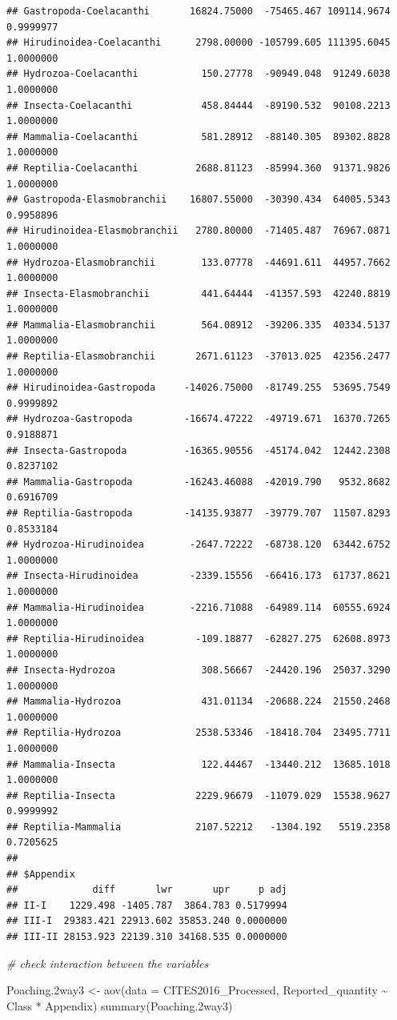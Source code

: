 \documentclass[
  12pt,
]{article}
\newenvironment{Shaded}{\begin{snugshade}}{\end{snugshade}}
\newcommand{\AttributeTok}[1]{\textcolor[rgb]{0.77,0.63,0.00}{#1}}
\newcommand{\CommentTok}[1]{\textcolor[rgb]{0.56,0.35,0.01}{\textit{#1}}}
\newcommand{\FloatTok}[1]{\textcolor[rgb]{0.00,0.00,0.81}{#1}}
\newcommand{\FunctionTok}[1]{\textcolor[rgb]{0.00,0.00,0.00}{#1}}
\newcommand{\NormalTok}[1]{#1}
\newcommand{\OtherTok}[1]{\textcolor[rgb]{0.56,0.35,0.01}{#1}}
\newcommand{\SpecialCharTok}[1]{\textcolor[rgb]{0.00,0.00,0.00}{#1}}
\begin{document}
\begin{verbatim}
## Gastropoda-Coelacanthi       16824.75000  -75465.467 109114.9674 0.9999977
## Hirudinoidea-Coelacanthi      2798.00000 -105799.605 111395.6045 1.0000000
## Hydrozoa-Coelacanthi           150.27778  -90949.048  91249.6038 1.0000000
## Insecta-Coelacanthi            458.84444  -89190.532  90108.2213 1.0000000
## Mammalia-Coelacanthi           581.28912  -88140.305  89302.8828 1.0000000
## Reptilia-Coelacanthi          2688.81123  -85994.360  91371.9826 1.0000000
## Gastropoda-Elasmobranchii    16807.55000  -30390.434  64005.5343 0.9958896
## Hirudinoidea-Elasmobranchii   2780.80000  -71405.487  76967.0871 1.0000000
## Hydrozoa-Elasmobranchii        133.07778  -44691.611  44957.7662 1.0000000
## Insecta-Elasmobranchii         441.64444  -41357.593  42240.8819 1.0000000
## Mammalia-Elasmobranchii        564.08912  -39206.335  40334.5137 1.0000000
## Reptilia-Elasmobranchii       2671.61123  -37013.025  42356.2477 1.0000000
## Hirudinoidea-Gastropoda     -14026.75000  -81749.255  53695.7549 0.9999892
## Hydrozoa-Gastropoda         -16674.47222  -49719.671  16370.7265 0.9188871
## Insecta-Gastropoda          -16365.90556  -45174.042  12442.2308 0.8237102
## Mammalia-Gastropoda         -16243.46088  -42019.790   9532.8682 0.6916709
## Reptilia-Gastropoda         -14135.93877  -39779.707  11507.8293 0.8533184
## Hydrozoa-Hirudinoidea        -2647.72222  -68738.120  63442.6752 1.0000000
## Insecta-Hirudinoidea         -2339.15556  -66416.173  61737.8621 1.0000000
## Mammalia-Hirudinoidea        -2216.71088  -64989.114  60555.6924 1.0000000
## Reptilia-Hirudinoidea         -109.18877  -62827.275  62608.8973 1.0000000
## Insecta-Hydrozoa               308.56667  -24420.196  25037.3290 1.0000000
## Mammalia-Hydrozoa              431.01134  -20688.224  21550.2468 1.0000000
## Reptilia-Hydrozoa             2538.53346  -18418.704  23495.7711 1.0000000
## Mammalia-Insecta               122.44467  -13440.212  13685.1018 1.0000000
## Reptilia-Insecta              2229.96679  -11079.029  15538.9627 0.9999992
## Reptilia-Mammalia             2107.52212   -1304.192   5519.2358 0.7205625
## 
## $Appendix
##             diff       lwr       upr     p adj
## II-I    1229.498 -1405.787  3864.783 0.5179994
## III-I  29383.421 22913.602 35853.240 0.0000000
## III-II 28153.923 22139.310 34168.535 0.0000000
\end{verbatim}

\begin{Shaded}
\begin{Highlighting}[]
\CommentTok{\# check interaction between the variables}

\NormalTok{Poaching}\FloatTok{.2}\NormalTok{way3 }\OtherTok{\textless{}{-}} \FunctionTok{aov}\NormalTok{(}\AttributeTok{data =}\NormalTok{ CITES2016\_Processed, Reported\_quantity }\SpecialCharTok{\textasciitilde{}}\NormalTok{ Class }\SpecialCharTok{*}\NormalTok{ Appendix)}
\FunctionTok{summary}\NormalTok{(Poaching}\FloatTok{.2}\NormalTok{way3)}
\end{Highlighting}
\end{Shaded}
\end{document}

